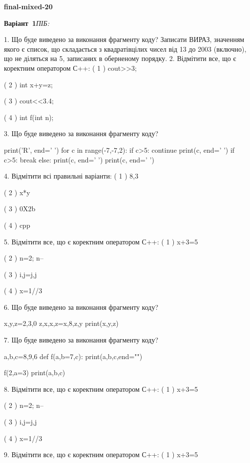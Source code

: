 \documentclass[11pt]{article}
\begin{document}
{\large\textbf{final-mixed-20}}

\textbf{Варіант \No\,1}\hfill \textit{ПІБ:}\,\underline{\hspace{60mm}}
\vspace{4mm}

1. Що буде виведено за виконання фрагменту коду?
Записати ВИРАЗ, значенням якого є список, що складається з квадратівцілих чисел від 13 до 2003 (включно), що не діляться на 5, записаних в оберненому порядку.
2. Відмітити все, що є коректним оператором С++:
( 1 ) cout>>3;

( 2 ) int x+y=z;

( 3 ) cout<<3.4;

( 4 ) int f(int n);

3. Що буде виведено за виконання фрагменту коду?

print('R', end=' ')
for c in range(-7,-7,2):
    if c>5:
        continue
        print(c, end=' ')
    if c>5:
        break
    else:
        print(c, end=' ')
    print(c, end=' ')

4. Відмітити всі правильні варіанти:
( 1 ) 8,3

( 2 ) x*y

( 3 ) 0X2b

( 4 ) cpp

5. Відмітити все, що є коректним оператором С++:
( 1 ) x+3=5

( 2 ) n=2; n--

( 3 ) i,j=j,j

( 4 ) x=1//3

6. Що буде виведено за виконання фрагменту коду?

x,y,z=2,3,0
z,x,x,z=x,8,z,y
print(x,y,z)

7. Що буде виведено за виконання фрагменту коду?

a,b,c=8,9,6
def f(a,b=7,c):
    print(a,b,c,end="")

f(2,a=3)
print(a,b,c)


8. Відмітити все, що є коректним оператором С++:
( 1 ) x+3=5

( 2 ) n=2; n--

( 3 ) i,j=j,j

( 4 ) x=1//3

9. Відмітити все, що є коректним оператором С++:
( 1 ) x+3=5
\end{document}
